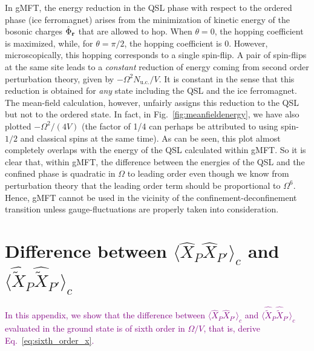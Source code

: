 \documentclass[twocolumn,superscriptaddress,amsmath,amssymb,aps,prx,nofootinbib]{revtex4-2}
\newcommand{\newtext}[1]{\textcolor{purple}{#1}}
\begin{document}
In gMFT, the energy reduction in the QSL phase with respect to the ordered phase (ice ferromagnet) arises from the minimization of kinetic energy of the bosonic charges $\hat{\Phi}_{\vb{r}}$ that are allowed to hop. When $\theta=0$, the hopping coefficient is maximized, while, for $\theta=\pi/2$, the hopping coefficient is 0. However, microscopically, this hopping corresponds to a single spin-flip. A pair of spin-flips at the same site leads to a \textit{constant} reduction of energy coming from second order perturbation theory, given by $-\Omega^2 N_{\text{u.c.}}/V$. It is constant in the sense that this reduction is obtained for \textit{any} state including the QSL and the ice ferromagnet. The mean-field calculation, however, unfairly assigns this reduction to the QSL but not to the ordered state. In fact, in Fig.~\ref{fig:meanfieldenergy}, we have also plotted $-\Omega^2/(4V)$ (the factor of 1/4 can perhaps be attributed to using spin-$1/2$ and classical spins at the same time). As can be seen, this plot almost completely overlaps with the energy of the QSL calculated within gMFT. So it is clear that, within gMFT, the difference between the energies of the QSL and the confined phase is quadratic in $\Omega$ to leading order even though we know from perturbation theory that the leading order term should be proportional to $\Omega^6$. Hence, gMFT cannot be used in the vicinity of the confinement-deconfinement transition unless gauge-fluctuations are properly taken into consideration.

\section{Difference between $\langle \hat{X}_P \hat{X}_{P'} \rangle_c $ and $ \langle \hat{\tilde{X}}_P \hat{\tilde{X}}_{P'} \rangle_c$}\label{app:corrections_plaq}

\newtext{In this appendix, we show that the difference between $\langle \hat{X}_P \hat{X}_{P'} \rangle_c $ and $ \langle \hat{\tilde{X}}_P \hat{\tilde{X}}_{P'} \rangle_c$ evaluated in the ground state is of sixth order in $\Omega/V$, that is, derive Eq.~\eqref{eq:sixth_order_x}.}
\end{document}
